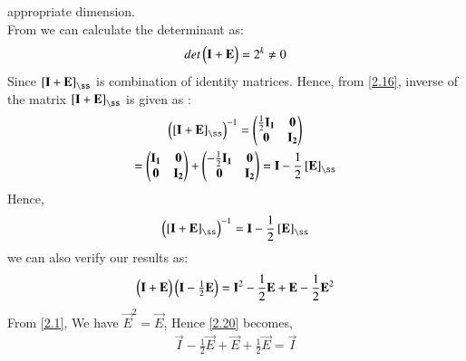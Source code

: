 \documentclass[journal,12pt,twocolumn]{IEEEtran}
\begin{document}
	appropriate dimension.\\
	From  we can calculate the determinant as:
	\begin{align}
	det\begin{pmatrix}\mathbf{I} + \mathbf{E}\end{pmatrix} = 2^k \neq  0
	\end{align}
	Since $\left[ \vec{I} + \vec{E}\right]_{\ss}$ is combination of identity matrices. Hence, from \eqref{2.16}, inverse of the matrix  $\left[ \vec{I} + \vec{E}\right]_{\ss}$ is given as :
	\begin{multline}
	\myvec{\left[ \vec{I} + \vec{E}\right]_{\ss} }^{-1} = \myvec{\frac{1}{2}\vec{I_1} & \vec{0} \\ \vec{0} & \vec{I_2} }\\
	=   \myvec{\vec{I_1} & \vec{0} \\
		\vec{0} & \vec{I_2} } +  \myvec{-\frac{1}{2}\vec{I_1} & \vec{0} \\
		\vec{0} & \vec{I_2}} = \vec{I} - \frac{1}{2}\left[\vec{E}\right]_{\ss}
	\end{multline}
	Hence,
	\begin{align}
	\myvec{\left[ \vec{I} + \vec{E}\right]_{\ss} }^{-1} = \vec{I} - \frac{1}{2}\left[\vec{E}\right]_{\ss}
	\end{align}
	we can also verify our results as:
	\begin{multline}
	\begin{pmatrix}\mathbf{I} + \mathbf{E}\end{pmatrix}\begin{pmatrix}\mathbf{I} - \frac{1}{2}\mathbf{E}\end{pmatrix} = \mathbf{I}^2- \frac{1}{2}\mathbf{E} +\mathbf{E}- \frac{1}{2}\mathbf{E}^2 \label{2.20}
	\end{multline}
	From \eqref{2.1}, We have $\vec{E}^2 = \vec{E}$, Hence \eqref{2.20} becomes,
	\begin{align}
	\vec{I} - \frac{1}{2}\vec{E} +\vec{E} + \frac{1}{2}\vec{E} = \vec{I}
	\end{align}
\end{document}
